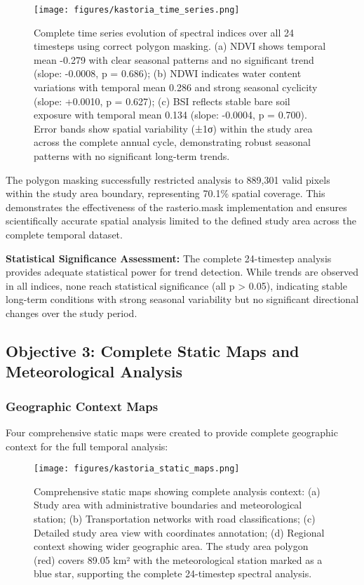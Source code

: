 \documentclass[a4paper,12pt]{article}
\begin{document}
\begin{figure}[H]
    \centering
    \texttt{[image: figures/kastoria\_time\_series.png]}
    \caption{Complete time series evolution of spectral indices over all 24 timesteps using correct polygon masking. (a) NDVI shows temporal mean -0.279 with clear seasonal patterns and no significant trend (slope: -0.0008, p = 0.686); (b) NDWI indicates water content variations with temporal mean 0.286 and strong seasonal cyclicity (slope: +0.0010, p = 0.627); (c) BSI reflects stable bare soil exposure with temporal mean 0.134 (slope: -0.0004, p = 0.700). Error bands show spatial variability (±1σ) within the study area across the complete annual cycle, demonstrating robust seasonal patterns with no significant long-term trends.}
    \label{fig:time_series}
\end{figure}

The polygon masking successfully restricted analysis to 889,301 valid pixels
within the study area boundary, representing 70.1\% spatial coverage. This
demonstrates the effectiveness of the rasterio.mask implementation and ensures
scientifically accurate spatial analysis limited to the defined study area across
the complete temporal dataset.

\textbf{Statistical Significance Assessment:} The complete 24-timestep analysis provides
adequate statistical power for trend detection. While trends are observed in all indices,
none reach statistical significance (all p > 0.05), indicating stable long-term conditions
with strong seasonal variability but no significant directional changes over the study period.

\subsection{Objective 3: Complete Static Maps and Meteorological Analysis}

\subsubsection{Geographic Context Maps}

Four comprehensive static maps were created to provide complete geographic
context for the full temporal analysis:

\begin{figure}[H]
    \centering
    \texttt{[image: figures/kastoria\_static\_maps.png]}
    \caption{Comprehensive static maps showing complete analysis context: (a) Study area with administrative boundaries and meteorological station; (b) Transportation networks with road classifications; (c) Detailed study area view with coordinates annotation; (d) Regional context showing wider geographic area. The study area polygon (red) covers 89.05 km² with the meteorological station marked as a blue star, supporting the complete 24-timestep spectral analysis.}
    \label{fig:static_maps}
\end{figure}
\end{document}
